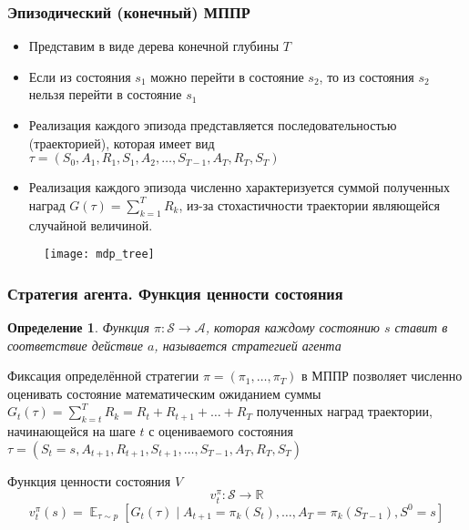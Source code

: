 \documentclass[notheorems]{beamer} %
\newtheorem{definition}{Определение}
\begin{document}
\begin{frame}
	\frametitle{Эпизодический (конечный) МППР}
	\begin{itemize}
		\item Представим в виде дерева конечной глубины $T$
		\item Если из состояния $s_1$  можно перейти в состояние $s_2$, то из состояния $s_2$ нельзя перейти в состояние $s_1$
		\item Реализация каждого эпизода представляется последовательностью (траекторией), которая  имеет вид
		$\tau = (S_0, A_1, R_1, S_1, A_2, \dots, S_{T-1}, A_{T}, R_{T}, S_T)$  
		\item Реализация каждого эпизода  численно характеризуется суммой полученных наград  $G(\tau) =  \sum_{k=1}^{T}R_k$,  из-за стохастичности траектории являющейся случайной величиной.
	\end{itemize}
\begin{figure}
	\texttt{[image: mdp\_tree]}
\end{figure}
	
	
\end{frame}
\begin{frame}
\frametitle{Стратегия агента. Функция ценности состояния}	

\begin{definition} Функция $\pi: \mathcal{S} \to \mathcal{A}$, которая каждому состоянию $s$ ставит в соответствие действие $a$, называется \alert{стратегией агента} \end{definition}

Фиксация определённой стратегии $\pi = (\pi_1, \dots , \pi_T)$ в МППР позволяет численно оценивать состояние математическим ожиданием суммы $G_t(\tau) =  \sum_{k=t}^{T}R_k=R_t+ R_{t+1}+ \dots +R_T$ полученных наград траектории, начинающейся на шаге $t$ с оцениваемого состояния $\tau =(S_t=s, A_{t+1}, R_{t+1}, S_{t+1}, \dots, S_{T-1}, A_{T}, R_{T}, S_T)$ 

\begin{alertblock}{Функция ценности состояния $V$}
	$$v_t^\pi: \mathcal{S} \to \mathbb{R}$$
	$$ v_t^\pi(s) = \mathop{\mathbb{E}}_{\tau \sim p}[G_t(\tau) \mid A_{t+1}=\pi_k(S_t) ,\dots,A_{T}=\pi_k(S_{T-1}), S^0=s] $$
\end{alertblock}

\end{frame}
\end{document}
